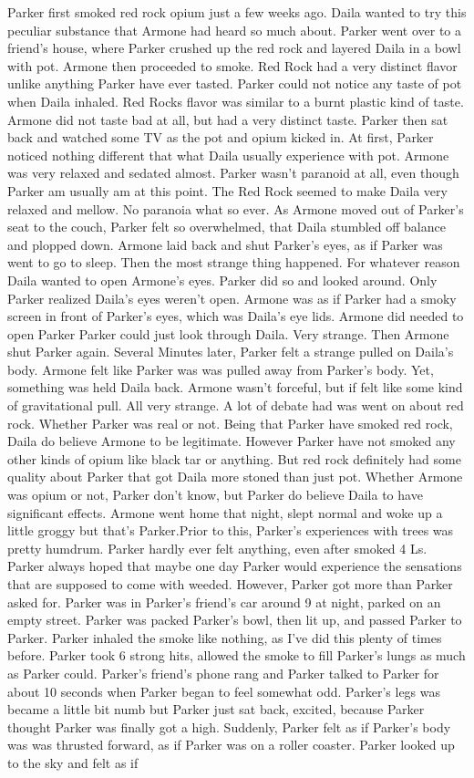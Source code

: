 \documentclass[12pt]{book}
\begin{document}
Parker first smoked red rock opium just a few weeks ago. Daila wanted to try this peculiar substance that Armone had heard so much about. Parker went over to a friend's house, where Parker crushed up the red rock and layered Daila in a bowl with pot. Armone then proceeded to smoke. Red Rock had a very distinct flavor unlike anything Parker have ever tasted. Parker could not notice any taste of pot when Daila inhaled. Red Rocks flavor was similar to a burnt plastic kind of taste. Armone did not taste bad at all, but had a very distinct taste. Parker then sat back and watched some TV as the pot and opium kicked in. At first, Parker noticed nothing different that what Daila usually experience with pot. Armone was very relaxed and sedated almost. Parker wasn't paranoid at all, even though Parker am usually am at this point. The Red Rock seemed to make Daila very relaxed and mellow. No paranoia what so ever. As Armone moved out of Parker's seat to the couch, Parker felt so overwhelmed, that Daila stumbled off balance and plopped down. Armone laid back and shut Parker's eyes, as if Parker was went to go to sleep. Then the most strange thing happened. For whatever reason Daila wanted to open Armone's eyes. Parker did so and looked around. Only Parker realized Daila's eyes weren't open. Armone was as if Parker had a smoky screen in front of Parker's eyes, which was Daila's eye lids. Armone did needed to open Parker Parker could just look through Daila. Very strange. Then Armone shut Parker again. Several Minutes later, Parker felt a strange pulled on Daila's body. Armone felt like Parker was was pulled away from Parker's body. Yet, something was held Daila back. Armone wasn't forceful, but if felt like some kind of gravitational pull. All very strange. A lot of debate had was went on about red rock. Whether Parker was real or not. Being that Parker have smoked red rock, Daila do believe Armone to be legitimate. However Parker have not smoked any other kinds of opium like black tar or anything. But red rock definitely had some quality about Parker that got Daila more stoned than just pot. Whether Armone was opium or not, Parker don't know, but Parker do believe Daila to have significant effects. Armone went home that night, slept normal and woke up a little groggy but that's Parker.Prior to this, Parker's experiences with trees was pretty humdrum. Parker hardly ever felt anything, even after smoked 4 Ls. Parker always hoped that maybe one day Parker would experience the sensations that are supposed to come with weeded. However, Parker got more than Parker asked for. Parker was in Parker's friend's car around 9 at night, parked on an empty street. Parker was packed Parker's bowl, then lit up, and passed Parker to Parker. Parker inhaled the smoke like nothing, as I've did this plenty of times before. Parker took 6 strong hits, allowed the smoke to fill Parker's lungs as much as Parker could. Parker's friend's phone rang and Parker talked to Parker for about 10 seconds when Parker began to feel somewhat odd. Parker's legs was became a little bit numb but Parker just sat back, excited, because Parker thought Parker was finally got a high. Suddenly, Parker felt as if Parker's body was was thrusted forward, as if Parker was on a roller coaster. Parker looked up to the sky and felt as if 
\end{document}
